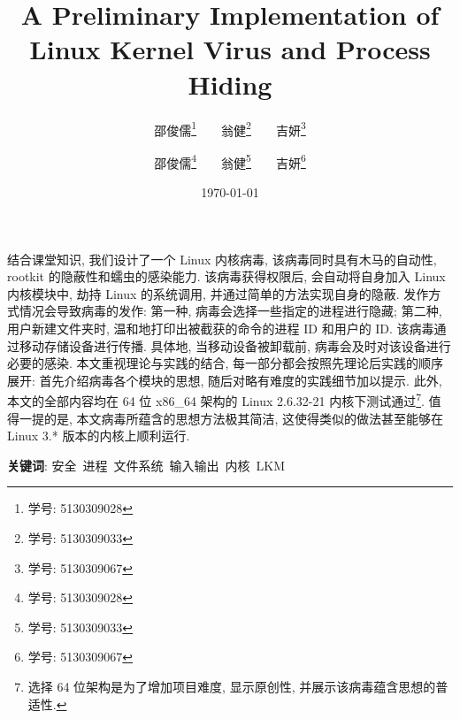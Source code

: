 \documentclass[11pt,fleqn]{book} %
\author{邵俊儒\thanks{学号: 5130309028}~~~~翁健\thanks{学号: 5130309033}~~~~吉妍\thanks{学号: 5130309067}}
\affil{\small{ACM Honored Class\\ Zhiyuan College \\ Shanghai Jiao Tong University} }
\makeatletter
\newenvironment{abstract}{%
      \titlepage
      \null\vfil
      \@beginparpenalty\@lowpenalty
      \begin{center}%
        \bfseries \abstractname
        \@endparpenalty\@M
      \end{center}}%
     {\par\vfil\null\endtitlepage}
\newenvironment{abstract}{%
      \if@twocolumn
        \section*{\abstractname}%
      \else
        \small
        \begin{center}%
          {\bfseries \abstractname\vspace{-.5em}\vspace{\z@}}%
        \end{center}%
        \quotation
      \fi}
      {\if@twocolumn\else\endquotation\fi}
\makeatother
\begin{document}

\title{\textbf{A Preliminary Implementation of Linux Kernel Virus and Process
Hiding}}


\author{邵俊儒\thanks{学号: 5130309028}~~~~翁健\thanks{学号: 5130309033}~~~~吉妍\thanks{学号: 5130309067}}


\date{\today}
\maketitle
\begin{abstract}
结合课堂知识, 我们设计了一个 Linux 内核病毒, 该病毒同时具有木马的自动性, rootkit 的隐蔽性和蠕虫的感染能力. 该病毒获得权限后,
会自动将自身加入 Linux 内核模块中, 劫持 Linux 的系统调用, 并通过简单的方法实现自身的隐蔽. 发作方式情况会导致病毒的发作:
第一种, 病毒会选择一些指定的进程进行隐藏; 第二种, 用户新建文件夹时, 温和地打印出被截获的命令的进程 ID 和用户的 ID.
该病毒通过移动存储设备进行传播. 具体地, 当移动设备被卸载前, 病毒会及时对该设备进行必要的感染. 本文重视理论与实践的结合, 每一部分都会按照先理论后实践的顺序展开:
首先介绍病毒各个模块的思想, 随后对略有难度的实践细节加以提示. 此外, 本文的全部内容均在 64 位 x86\_64 架构的 Linux
2.6.32-21 内核下测试通过\footnote{选择 64 位架构是为了增加项目难度, 显示原创性, 并展示该病毒蕴含思想的普适性.}.
值得一提的是, 本文病毒所蕴含的思想方法极其简洁, 这使得类似的做法甚至能够在 Linux 3.{*} 版本的内核上顺利运行.

\vspace{2cm}

\noindent  \textbf{关键词}: 安全~进程~文件系统~输入输出~内核~LKM
\end{abstract}



\pagestyle{empty} %

\tableofcontents %

\cleardoublepage %

\pagestyle{fancy} %
\end{document}
